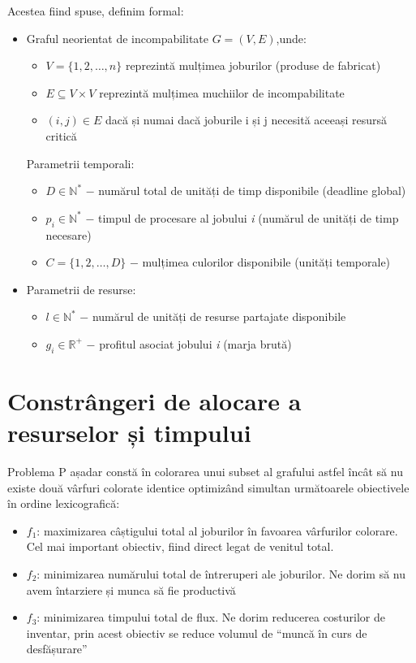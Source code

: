     Acestea fiind spuse, definim formal:
    \begin{itemize}
      \item Graful neorientat de incompabilitate $G=(V,E)$,unde:
      \begin{itemize}
        \item $V=\{1,2,\ldots,n\}$  reprezintă mulțimea joburilor (produse de fabricat)
        \item $E \subseteq V \times V$ reprezintă mulțimea muchiilor de incompabilitate
        \item $(i,j) \in E$ dacă și numai dacă joburile i și j necesită aceeași resursă critică
      \end{itemize}
    Parametrii temporali:
      \begin{itemize}
        \item $D \in \mathbb{N}^*$ $-$ numărul total de unități de timp disponibile (deadline global)
        \item $p_i \in \mathbb{N}^*$ $-$ timpul de procesare al jobului \textit{i} (numărul de unități de timp necesare)
        \item $C=\{1,2,\ldots,D\}$ $-$ mulțimea culorilor disponibile (unități temporale)
      \end{itemize}
      \item Parametrii de resurse:
      \begin{itemize}
        \item $l \in \mathbb{N}^*$ $-$ numărul de unități de resurse partajate disponibile
        \item $g_i \in \mathbb{R}^+$ $-$ profitul asociat jobului \textit{i} (marja brută)      
    \end{itemize}
  \end{itemize}
    
    





\section{Constrângeri de alocare a resurselor și timpului}

     Problema P așadar constă în colorarea unui subset al grafului astfel încât să nu existe două vârfuri colorate identice optimizând simultan următoarele  obiectivele în ordine lexicografică: 
    \begin{itemize}
    \item $f_1$: maximizarea câștigului total al joburilor în favoarea vârfurilor colorare. Cel mai important obiectiv, fiind direct legat de venitul total. 
    \item $f_2$: minimizarea numărului total de întreruperi ale joburilor. Ne dorim să nu avem întarziere și munca să fie productivă
    \item $f_3$: minimizarea timpului total de flux. Ne dorim reducerea costurilor de inventar, prin acest obiectiv se reduce volumul de ``muncă în curs de desfășurare''
    \end{itemize}
      

